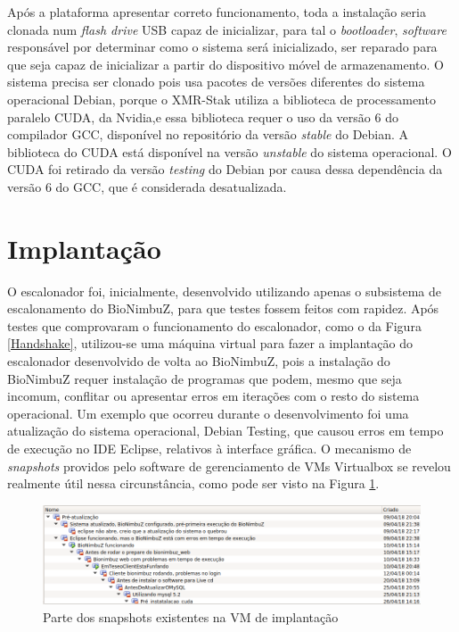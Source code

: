 Após a plataforma apresentar correto funcionamento, toda a instalação seria clonada num \textit{flash drive} \acrshort{USB} capaz de inicializar, para tal o \textit{bootloader}, \textit{software} responsável por determinar como o sistema será inicializado, ser reparado para que seja capaz de inicializar a partir do dispositivo móvel de armazenamento. O sistema precisa ser clonado pois usa pacotes de versões diferentes do sistema operacional Debian\cite{Debian}, porque o XMR-Stak utiliza a biblioteca de processamento paralelo \acrshort{CUDA}\cite{CUDA}, da Nvidia\cite{NVIDIA},e essa biblioteca requer o uso da versão 6 do compilador \acrshort{GCC}\cite{GCC}, disponível no repositório da versão \textit{stable} do Debian. A biblioteca do CUDA está disponível na versão \textit{unstable} do sistema operacional. O \acrshort{CUDA} foi retirado da versão \textit{testing} do Debian por causa dessa dependência da versão 6 do \acrshort{GCC}, que é considerada desatualizada\cite{CUDA_BUGREP}.


\section{Implantação}

O escalonador foi, inicialmente, desenvolvido utilizando apenas o subsistema de escalonamento do BioNimbuZ, para que testes fossem feitos com rapidez. Após testes que comprovaram o funcionamento do escalonador, como o da Figura \ref{Handshake}, utilizou-se uma máquina virtual para fazer a implantação do escalonador desenvolvido de volta ao BioNimbuZ, pois a instalação do BioNimbuZ requer instalação de programas que podem, mesmo que seja incomum, conflitar ou apresentar erros em iterações com o resto do sistema operacional. Um exemplo que ocorreu durante o desenvolvimento foi uma atualização do sistema operacional, Debian\cite{Debian} Testing\cite{DebianTesting}, que causou erros em tempo de execução no \acrfull{IDE} Eclipse\cite{JavaEclipse}, relativos à interface gráfica. O mecanismo de \textit{snapshots} providos pelo software de gerenciamento de \acrshort{VM}s Virtualbox\cite{VirtualBox} se revelou realmente útil nessa circunstância, como pode ser visto na Figura \ref{Snapshots}.

\begin{figure}[htbp]
	\centerline{\includegraphics[width=12cm]{img/Snapshots.png}}
	\caption{Parte dos snapshots existentes na \acrshort{VM} de implantação}
	\label{Snapshots}
\end{figure}

